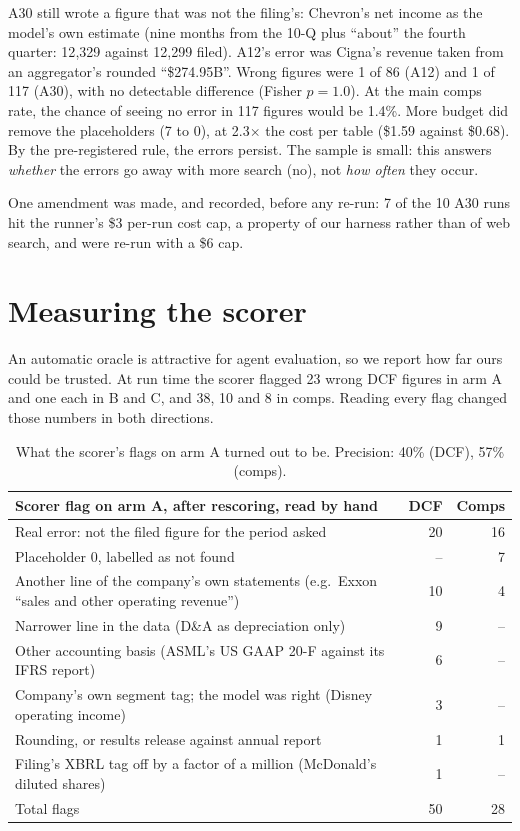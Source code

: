 \documentclass[10pt,a4paper]{article}
\begin{document}
A30 still wrote a figure that was not the filing's: Chevron's net income as the model's own estimate (nine months
from the 10-Q plus ``about'' the fourth quarter: 12{,}329 against 12{,}299 filed). A12's error was Cigna's revenue
taken from an aggregator's rounded ``\$274.95B''. Wrong figures were 1 of 86 (A12) and 1 of 117 (A30), with no
detectable difference (Fisher $p = 1.0$). At the main comps rate, the chance of seeing no error in 117 figures would
be 1.4\%. More budget did remove the placeholders (7 to 0), at 2.3$\times$ the cost per table (\$1.59 against
\$0.68). By the pre-registered rule, the errors persist. The sample is small: this answers \emph{whether} the errors
go away with more search (no), not \emph{how often} they occur.

One amendment was made, and recorded, before any re-run: 7 of the 10 A30 runs hit the runner's \$3 per-run cost
cap, a property of our harness rather than of web search, and were re-run with a \$6 cap.

\section{Measuring the scorer}
\label{sec:scorer}

An automatic oracle is attractive for agent evaluation, so we report how far ours could be trusted. At run time the
scorer flagged 23 wrong DCF figures in arm A and one each in B and C, and 38, 10 and 8 in comps. Reading every flag
changed those numbers in both directions.

\begin{table}[htb]
\centering
\small
\begin{tabular}{>{\raggedright\arraybackslash}p{10.2cm}rr}
\toprule
Scorer flag on arm A, after rescoring, read by hand & DCF & Comps \\
\midrule
Real error: not the filed figure for the period asked & 20 & 16 \\
Placeholder 0, labelled as not found & -- & 7 \\
Another line of the company's own statements (e.g.\ Exxon ``sales and other operating revenue'') & 10 & 4 \\
Narrower line in the data (D\&A as depreciation only) & 9 & -- \\
Other accounting basis (ASML's US GAAP 20-F against its IFRS report) & 6 & -- \\
Company's own segment tag; the model was right (Disney operating income) & 3 & -- \\
Rounding, or results release against annual report & 1 & 1 \\
Filing's XBRL tag off by a factor of a million (McDonald's diluted shares) & 1 & -- \\
\midrule
Total flags & 50 & 28 \\
\bottomrule
\end{tabular}
\caption{What the scorer's flags on arm A turned out to be. Precision: 40\% (DCF), 57\% (comps).}
\label{tab:scorer}
\end{table}
\end{document}

